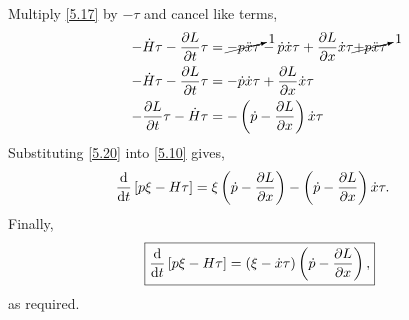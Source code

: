 Multiply \eqref{5.17} by $-\tau$ and cancel like terms,
\begin{align}
\label{5.18}
	-\dot{H}\tau - \frac{\partial L}{\partial t}\tau &= \cancelto{1}{-p\ddot{x}\tau} -\dot{p}\dot{x}\tau + \frac{\partial L}{\partial x}\dot{x}\tau \cancelto{1}{+ p\ddot{x}\tau}\\
\label{5.19}
	-\dot{H}\tau - \frac{\partial L}{\partial t}\tau &=  -\dot{p}\dot{x}\tau + \frac{\partial L}{\partial x}\dot{x}\tau\\
\label{5.20}
	 - \frac{\partial L}{\partial t}\tau -\dot{H}\tau&= - \left(\dot{p} - \frac{\partial L}{\partial x}\right)\dot{x}\tau
\end{align}
Substituting \eqref{5.20} into \eqref{5.10} gives,
\begin{align}
\label{5.21}
	\frac{\mathrm{d}}{\mathrm{d}t}\left[p\xi-H\tau\right]&=  \xi\left(\dot{p} -\frac{\partial L}{\partial x}\right) - \left(\dot{p} - \frac{\partial L}{\partial x}\right)\dot{x}\tau.
\end{align}
Finally,
\begin{align}
\label{5.22}
	\boxed{\frac{\mathrm{d}}{\mathrm{d}t}\left[p\xi-H\tau\right] =  \left(\xi- \dot{x}\tau\right)\left(\dot{p} -\frac{\partial L}{\partial x}\right),}
\end{align}
as required.

